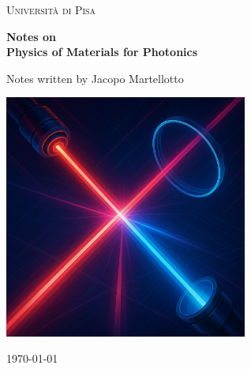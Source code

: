 \documentclass[11pt,a4paper]{book}
\begin{document}
\begin{titlepage}
    \centering
    \vspace*{2cm}
    
    {\scshape\LARGE Università di Pisa \par}
    \vspace{1.5cm}
    {\Huge\bfseries Notes on \\[0.5cm]
    Physics of Materials for Photonics\par}
    \vspace{1.0cm}
    {\Large Notes written by Jacopo Martellotto\par}
    \vspace{0.5cm}
    \begin{center}
    \includegraphics[width=0.6\textwidth]{img/cover.png}
    \vspace{1cm}
    \end{center}
    {\large \today\par}
\end{titlepage}

\tableofcontents
\newpage









\cleardoublepage
{}
{}


\end{document}
